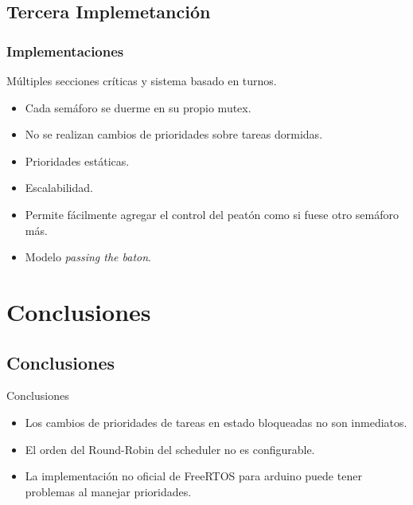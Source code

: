 \subsection{Tercera Implemetanción}
\begin{frame}
\frametitle{Implementaciones}
\begin{block}{Múltiples secciones críticas y sistema basado en turnos.}
	\begin{itemize}
		\item Cada semáforo se duerme en su propio mutex.
		\item No se realizan cambios de prioridades sobre tareas dormidas.
		\item Prioridades estáticas.
		\item Escalabilidad.
		\item Permite fácilmente agregar el control del peatón como si fuese otro semáforo más.
		\item Modelo \emph{passing the baton}.
	\end{itemize}
\end{block}
\end{frame}

\section{Conclusiones}

\subsection{Conclusiones}
\begin{frame}
	\begin{block}{Conclusiones}
		\begin{itemize}
			\item Los cambios de prioridades de tareas en estado bloqueadas no son inmediatos.
			\item El orden del Round-Robin del scheduler no es configurable.
			\item La implementación no oficial de FreeRTOS para arduino puede tener problemas al manejar prioridades.
		\end{itemize}
	\end{block}
\end{frame}